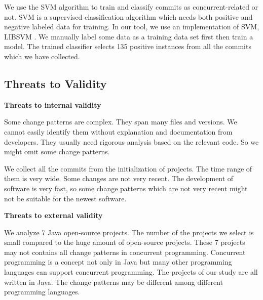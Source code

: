 \documentclass[conference]{IEEEtran}
\begin{document}
We use the SVM \cite{journals/ml/CortesV95} algorithm to train and classify commits as concurrent-related or not. SVM is a supervised classification algorithm which needs both positive and negative labeled data for training. In our tool, we use an implementation of SVM, LIBSVM \cite{libsvm}. We manually label some data as a training data set first then train a model. The trained classifier selects 135 positive instances from all the commits which we have collected.

\subsection{Threats to Validity}

\textbf{Threats to internal validity}


Some change patterns are complex. They span many files and versions. We cannot easily identify them without explanation and documentation from developers. They usually need rigorous analysis based on the relevant code. So we might omit some change patterns.

We collect all the commits from the initialization of projects. The time range of them is very wide. Some changes are not very recent. The development of software is very fast, so some change patterns which are not very recent might not be suitable for the newest software.

\textbf{Threats to external validity}

We analyze 7 Java open-source projects. The number of the projects we select is small compared to the huge amount of open-source projects. These 7 projects may not contains all change patterns in concurrent programming. Concurrent programming is a concept not only in Java but many other programming languages can support concurrent programming. The projects of our study are all written in Java. The change patterns may be different among different programming languages.
\end{document}
